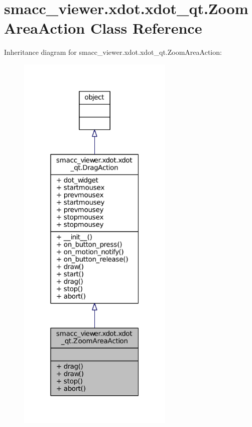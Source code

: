 \hypertarget{classsmacc__viewer_1_1xdot_1_1xdot__qt_1_1ZoomAreaAction}{}\section{smacc\+\_\+viewer.\+xdot.\+xdot\+\_\+qt.\+Zoom\+Area\+Action Class Reference}
\label{classsmacc__viewer_1_1xdot_1_1xdot__qt_1_1ZoomAreaAction}


Inheritance diagram for smacc\+\_\+viewer.\+xdot.\+xdot\+\_\+qt.\+Zoom\+Area\+Action\+:
\nopagebreak
\begin{figure}[H]
\begin{center}
\leavevmode
\includegraphics[width=211pt]{classsmacc__viewer_1_1xdot_1_1xdot__qt_1_1ZoomAreaAction__inherit__graph}
\end{center}
\end{figure}



